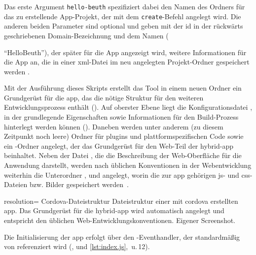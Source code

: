 
Das erste Argument \lstinline|hello-beuth| spezifiziert dabei den Namen des Ordners für das zu erstellende App-Projekt, der mit dem \lstinline|create|-Befehl angelegt wird.
Die anderen beiden Parameter sind optional und geben mit der \gls{id} in der rückwärts geschriebenen Domain-Bezeichnung und dem Namen ({\mbox{\enquote{HelloBeuth}}), der später für die App angezeigt wird, weitere Informationen für die App an, die in einer \gls{xml}-Datei im neu angelegten Projekt-Ordner gespeichert werden \cite{Cordova-Docs_CLI}.

Mit der Ausführung dieses Skripts erstellt das Tool in einem neuen Ordner ein Grundgerüst für die \gls{app}, das die nötige Struktur für den weiteren Entwicklungsprozess enthält ().
Auf oberster Ebene liegt die Konfigurationsdatei , in der grundlegende Eigenschaften sowie Informationen für den Build-Prozess hinterlegt werden können ().
Daneben werden unter anderem (zu diesem Zeitpunkt noch leere) Ordner für \glspl{plugin} und plattformspezifischen Code sowie ein -Ordner angelegt, der das Grundgerüst für den Web-Teil der \gls{hybrid-app} beinhaltet.
Neben der Datei , die die Beschreibung der Web-Oberfläche für die Anwendung darstellt, werden nach üblichen Konventionen in der Webentwicklung weiterhin die Unterordner ,  und  angelegt, worin die zur \gls{app} gehörigen \gls{js}- und \gls{css}-Dateien bzw. Bilder gespeichert werden~\cite{Cordova-Docs_CLI}.


	{resolution=\screenshotRes}
	{Cordova-Dateistruktur}
		{Dateistruktur einer mit \gls{cordova} erstellten \gls{app}. Das Grundgerüst für die \gls{hybrid-app} wird automatisch angelegt und entspricht den üblichen Web-Entwicklungskonventionen.}
	{Eigener Screenshot.}


	

Die Initialisierung der \gls{app} erfolgt über den -Eventhandler, der standardmäßig von  referenziert wird (,  und \autoref{lst:index.js}, \,u.\,12).

}
